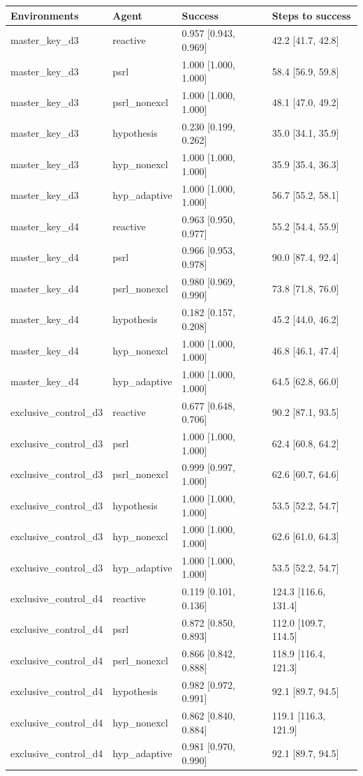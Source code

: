 \begin{tabular}{llll}
\toprule
Environments & Agent & Success & Steps to success \\
\midrule
master\_key\_d3 & reactive & 0.957 [0.943, 0.969] & 42.2 [41.7, 42.8] \\
master\_key\_d3 & psrl & 1.000 [1.000, 1.000] & 58.4 [56.9, 59.8] \\
master\_key\_d3 & psrl\_nonexcl & 1.000 [1.000, 1.000] & 48.1 [47.0, 49.2] \\
master\_key\_d3 & hypothesis & 0.230 [0.199, 0.262] & 35.0 [34.1, 35.9] \\
master\_key\_d3 & hyp\_nonexcl & 1.000 [1.000, 1.000] & 35.9 [35.4, 36.3] \\
master\_key\_d3 & hyp\_adaptive & 1.000 [1.000, 1.000] & 56.7 [55.2, 58.1] \\
master\_key\_d4 & reactive & 0.963 [0.950, 0.977] & 55.2 [54.4, 55.9] \\
master\_key\_d4 & psrl & 0.966 [0.953, 0.978] & 90.0 [87.4, 92.4] \\
master\_key\_d4 & psrl\_nonexcl & 0.980 [0.969, 0.990] & 73.8 [71.8, 76.0] \\
master\_key\_d4 & hypothesis & 0.182 [0.157, 0.208] & 45.2 [44.0, 46.2] \\
master\_key\_d4 & hyp\_nonexcl & 1.000 [1.000, 1.000] & 46.8 [46.1, 47.4] \\
master\_key\_d4 & hyp\_adaptive & 1.000 [1.000, 1.000] & 64.5 [62.8, 66.0] \\
exclusive\_control\_d3 & reactive & 0.677 [0.648, 0.706] & 90.2 [87.1, 93.5] \\
exclusive\_control\_d3 & psrl & 1.000 [1.000, 1.000] & 62.4 [60.8, 64.2] \\
exclusive\_control\_d3 & psrl\_nonexcl & 0.999 [0.997, 1.000] & 62.6 [60.7, 64.6] \\
exclusive\_control\_d3 & hypothesis & 1.000 [1.000, 1.000] & 53.5 [52.2, 54.7] \\
exclusive\_control\_d3 & hyp\_nonexcl & 1.000 [1.000, 1.000] & 62.6 [61.0, 64.3] \\
exclusive\_control\_d3 & hyp\_adaptive & 1.000 [1.000, 1.000] & 53.5 [52.2, 54.7] \\
exclusive\_control\_d4 & reactive & 0.119 [0.101, 0.136] & 124.3 [116.6, 131.4] \\
exclusive\_control\_d4 & psrl & 0.872 [0.850, 0.893] & 112.0 [109.7, 114.5] \\
exclusive\_control\_d4 & psrl\_nonexcl & 0.866 [0.842, 0.888] & 118.9 [116.4, 121.3] \\
exclusive\_control\_d4 & hypothesis & 0.982 [0.972, 0.991] & 92.1 [89.7, 94.5] \\
exclusive\_control\_d4 & hyp\_nonexcl & 0.862 [0.840, 0.884] & 119.1 [116.3, 121.9] \\
exclusive\_control\_d4 & hyp\_adaptive & 0.981 [0.970, 0.990] & 92.1 [89.7, 94.5] \\
\bottomrule
\end{tabular}

